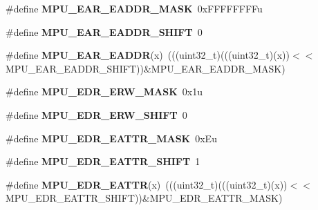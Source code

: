 \begin{DoxyCompactItemize}
\item 
\#define {\bfseries M\+P\+U\+\_\+\+E\+A\+R\+\_\+\+E\+A\+D\+D\+R\+\_\+\+M\+A\+SK}~0x\+F\+F\+F\+F\+F\+F\+F\+Fu\hypertarget{group__MPU__Register__Masks_ga2fec46c3866c88337f8ee0639c8d81b5}{}\label{group__MPU__Register__Masks_ga2fec46c3866c88337f8ee0639c8d81b5}

\item 
\#define {\bfseries M\+P\+U\+\_\+\+E\+A\+R\+\_\+\+E\+A\+D\+D\+R\+\_\+\+S\+H\+I\+FT}~0\hypertarget{group__MPU__Register__Masks_ga2bbd867e08b8ad2b609ab33a558e501c}{}\label{group__MPU__Register__Masks_ga2bbd867e08b8ad2b609ab33a558e501c}

\item 
\#define {\bfseries M\+P\+U\+\_\+\+E\+A\+R\+\_\+\+E\+A\+D\+DR}(x)~(((uint32\+\_\+t)(((uint32\+\_\+t)(x))$<$$<$M\+P\+U\+\_\+\+E\+A\+R\+\_\+\+E\+A\+D\+D\+R\+\_\+\+S\+H\+I\+FT))\&M\+P\+U\+\_\+\+E\+A\+R\+\_\+\+E\+A\+D\+D\+R\+\_\+\+M\+A\+SK)\hypertarget{group__MPU__Register__Masks_ga574a5bbf274f8184032844f9a9257597}{}\label{group__MPU__Register__Masks_ga574a5bbf274f8184032844f9a9257597}

\item 
\#define {\bfseries M\+P\+U\+\_\+\+E\+D\+R\+\_\+\+E\+R\+W\+\_\+\+M\+A\+SK}~0x1u\hypertarget{group__MPU__Register__Masks_ga469d59f7f1a51f8d7041b2404a246fb6}{}\label{group__MPU__Register__Masks_ga469d59f7f1a51f8d7041b2404a246fb6}

\item 
\#define {\bfseries M\+P\+U\+\_\+\+E\+D\+R\+\_\+\+E\+R\+W\+\_\+\+S\+H\+I\+FT}~0\hypertarget{group__MPU__Register__Masks_ga927ea9ae9756926304a7199714ee646a}{}\label{group__MPU__Register__Masks_ga927ea9ae9756926304a7199714ee646a}

\item 
\#define {\bfseries M\+P\+U\+\_\+\+E\+D\+R\+\_\+\+E\+A\+T\+T\+R\+\_\+\+M\+A\+SK}~0x\+Eu\hypertarget{group__MPU__Register__Masks_ga92ec1bda4da654cec287d9c1bfadd4e7}{}\label{group__MPU__Register__Masks_ga92ec1bda4da654cec287d9c1bfadd4e7}

\item 
\#define {\bfseries M\+P\+U\+\_\+\+E\+D\+R\+\_\+\+E\+A\+T\+T\+R\+\_\+\+S\+H\+I\+FT}~1\hypertarget{group__MPU__Register__Masks_gac76941d0d78453dcab7b06fc204a1abb}{}\label{group__MPU__Register__Masks_gac76941d0d78453dcab7b06fc204a1abb}

\item 
\#define {\bfseries M\+P\+U\+\_\+\+E\+D\+R\+\_\+\+E\+A\+T\+TR}(x)~(((uint32\+\_\+t)(((uint32\+\_\+t)(x))$<$$<$M\+P\+U\+\_\+\+E\+D\+R\+\_\+\+E\+A\+T\+T\+R\+\_\+\+S\+H\+I\+FT))\&M\+P\+U\+\_\+\+E\+D\+R\+\_\+\+E\+A\+T\+T\+R\+\_\+\+M\+A\+SK)\hypertarget{group__MPU__Register__Masks_ga3d8e0af02c0fc96347a27875ab672f5b}{}\label{group__MPU__Register__Masks_ga3d8e0af02c0fc96347a27875ab672f5b}


\end{DoxyCompactItemize}
